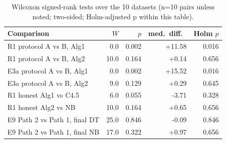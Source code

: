 \begin{table}[t]
\caption{Wilcoxon signed-rank tests over the 10 datasets (n=10 pairs unless noted; two-sided; Holm-adjusted p within this table).}
\label{tab:tests}
\centering
\small
\setlength{\tabcolsep}{3pt}
\begin{tabular}{lrrrr}
\toprule
Comparison & $W$ & $p$ & med.\ diff.\ & Holm $p$ \\
\midrule
R1 protocol A vs B, Alg1 & 0.0 & 0.002 & +11.58 & 0.016 \\
R1 protocol A vs B, Alg2 & 10.0 & 0.164 & +0.14 & 0.656 \\
E3a protocol A vs B, Alg1 & 0.0 & 0.002 & +15.52 & 0.016 \\
E3a protocol A vs B, Alg2 & 9.0 & 0.129 & +0.29 & 0.645 \\
R1 honest Alg1 vs C4.5 & 6.0 & 0.055 & -3.71 & 0.328 \\
R1 honest Alg2 vs NB & 10.0 & 0.164 & +0.65 & 0.656 \\
E9 Path 2 vs Path 1, final DT & 25.0 & 0.846 & -0.09 & 0.846 \\
E9 Path 2 vs Path 1, final NB & 17.0 & 0.322 & +0.97 & 0.656 \\
\bottomrule
\end{tabular}
\end{table}
